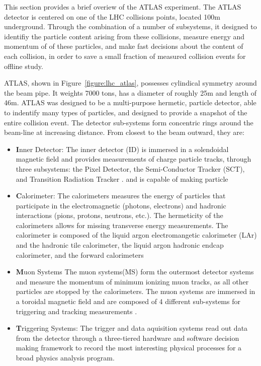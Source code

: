 This section provides a brief overiew of the ATLAS experiment. The ATLAS detector
is centered on one of the LHC collisions points, located 100m underground. Through
the combination of a number of subsystems, it designed to identifiy the 
particle content arising from these collisions, measure energy and momentum of  
of these particles, and make fast decisions about the content
of each collision, in order to save a small fraction of measured collision events
for offline study. 

ATLAS, shown in Figure~\ref{figure:lhc_atlas},  possesses cylindical symmetry around the beam pipe. It weights 7000 tons,
has a diameter of roughly 25m and length of 46m. ATLAS was designed to be a multi-purpose
hermetic, particle detector, able to indentify many types of particles, and designed to provide
a snapshot of the entire collision event. The detector sub-systems form concentric rings 
around the beam-line at increasing distance. From closest to the beam outward, they are:

\begin{itemize}

\item {\textbf Inner Detector:} The inner detector (ID)\cite{IDTDR1,IDTDR2} is immersed in a solendoidal magnetic field\cite{MagnetTDR} and provides measurements of charge particle tracks, through three subsystems: the Pixel Detector\cite{PixelTDR,PixelSensor}, the Semi-Conductor Tracker (SCT)\cite{SCTBarrel,SCTEndcap}, and Transition Radiation Tracker \cite{TRTStraws, TRTBarrel,trtelec}. 
and is capable of making particle
\item {\textbf Calorimeter:} The calorimeters measures the energy of particles that participate in the electromagnetic (photons, electrons) and hadronic interactions (pions, protons, neutrons, etc.). The hermeticity of the calorimeters allows for missing transverse energy measurements. The calorimeter is composed of the liquid argon electromangetic calorimeter (LAr)\cite{LArTDR:1996fq} and the hadronic tile calorimeter\cite{TileTDR}, the liquid argon hadronic endcap calorimeter, and the forward calorimeters 

\item {\textbf Muon Systems} The muon systems(MS)\cite{MuonTDR} form the outermost detector systems and measure the momentum of minimum ionizing muon tracks, as all other particles are stopped by the calorimeters. The muon systems are immersed in a toroidal magnetic field \cite{MagnetTDR} and are composed of 4 different sub-systems for triggering and tracking measurements \cite{RPCPaper,MDTPaper,CSCPaper}. 

\item {\textbf Triggering Systems:}  The trigger and data aquisition systems\cite{L1TDR,HLTTDR} read out data from the detector through a three-tiered hardware and software decision making framework to record the most interesting physical processes for a broad physics analysis program.   

\end{itemize}


